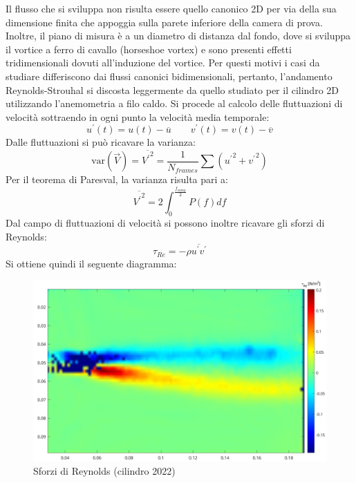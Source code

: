\noindent Il flusso che si sviluppa non risulta essere quello canonico 2D per via della sua dimensione finita che appoggia sulla parete inferiore della camera di prova. Inoltre, il piano di misura è a un diametro di distanza dal fondo, dove si sviluppa il vortice a ferro di cavallo (horseshoe vortex) e sono presenti effetti tridimensionali dovuti all'induzione del vortice. Per questi motivi i casi da studiare differiscono dai flussi canonici bidimensionali, pertanto, l'andamento Reynolds-Strouhal si discosta leggermente da quello studiato per il cilindro 2D utilizzando l'anemometria a filo caldo.
\newpage
\noindent Si procede al calcolo delle fluttuazioni di velocità sottraendo in ogni punto la velocità media temporale:
\begin{equation*}
    u^\prime(t) = u(t) - \overline u \qquad v^\prime(t) = v(t) - \overline v  
\end{equation*}
Dalle fluttuazioni si può ricavare la varianza:
\begin{equation*}
    \text{var}(\vec V) = \overline{{V^\prime}^2} = \frac 1{N_{frames}} \sum ({u^\prime}^2 + {v^\prime}^2)
\end{equation*}
Per il teorema di Paresval, la varianza risulta pari a:
\begin{equation*}
    \overline{{V^\prime}^2} = 2\int_0^{\frac{f_{samp}}2} P(f) df
\end{equation*}
Dal campo di fluttuazioni di velocità si possono inoltre ricavare gli sforzi di Reynolds:
\begin{equation*}
    \tau_{Re} = -\rho \overline{u^\prime v^\prime}
\end{equation*}
Si ottiene quindi il seguente diagramma:
\begin{figure}[H]
    \centering
    \includegraphics[width=\textwidth]{images/11/tauRe.png}
    \caption{Sforzi di Reynolds (cilindro 2022)}
\end{figure}